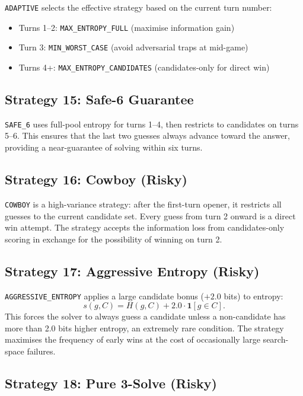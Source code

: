 \documentclass{article}
\begin{document}
\texttt{ADAPTIVE} selects the effective strategy based on the current turn number:
\begin{itemize}
  \item Turns 1--2: \texttt{MAX\_ENTROPY\_FULL} (maximise information gain)
  \item Turn 3: \texttt{MIN\_WORST\_CASE} (avoid adversarial traps at mid-game)
  \item Turns 4+: \texttt{MAX\_ENTROPY\_CANDIDATES} (candidates-only for direct win)
\end{itemize}

\subsection{Strategy 15: Safe-6 Guarantee}
\label{sec:strategy15}

\texttt{SAFE\_6} uses full-pool entropy for turns 1--4, then restricts to candidates
on turns 5--6. This ensures that the last two guesses always advance toward the
answer, providing a near-guarantee of solving within six turns.

\subsection{Strategy 16: Cowboy (Risky)}
\label{sec:strategy16}

\texttt{COWBOY} is a high-variance strategy: after the first-turn opener, it restricts
all guesses to the current candidate set. Every guess from turn 2 onward is a direct
win attempt. The strategy accepts the information loss from candidates-only scoring in
exchange for the possibility of winning on turn 2.

\subsection{Strategy 17: Aggressive Entropy (Risky)}
\label{sec:strategy17}

\texttt{AGGRESSIVE\_ENTROPY} applies a large candidate bonus ($+2.0$ bits) to entropy:
\[
  s(g, C) = H(g, C) + 2.0 \cdot \mathbf{1}[g \in C].
\]
This forces the solver to always guess a candidate unless a non-candidate has more
than 2.0 bits higher entropy, an extremely rare condition. The strategy maximises
the frequency of early wins at the cost of occasionally large search-space failures.

\subsection{Strategy 18: Pure 3-Solve (Risky)}
\label{sec:strategy18}
\end{document}
